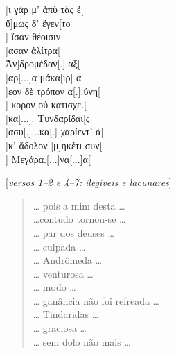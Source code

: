 \begin{gkverse}
]ι γάρ μ’ ἀπὺ τὰς ἐ[\\
ὔ]μως δ’ ἔγεν[το\\
   ] ἴσαν θέοισιν\\
 ]ασαν ἀλίτρα[\\
        Ἀν]δρομέδαν[.].αξ[\\
   ]αρ[...]α μάκα[ιρ] α\\
 ]εον δὲ τρόπον α[.].ύνη[\\
      ] κορον οὐ κατισχε.[\\
]κα[...]. Τυνδαρίδαι[ς\\
]ασυ[.]...κα[.] χαρίεντ’ ἀ[\\
]κ’ ἄδολον [μ]ηκέτι συν[\\
] Μεγάρα.[...]να[...]α[

\textnormal{[\emph{versos 1--2 e 4--7: ilegíveis e lacunares}]}

\end{gkverse}

\begin{verse}
\ldots{} pois a mim desta \ldots{}\\
\ldots{}contudo tornou-se \ldots{}\\
\ldots{} par dos deuses \ldots{}\\
\ldots{} culpada \ldots{}\\
\ldots{} Andrômeda \ldots{}\\
\ldots{} venturosa \ldots{}\\
\ldots{} modo \ldots{}\\
\ldots{} ganância não foi refreada \ldots{}\\
\ldots{} Tindaridas \ldots{}\\
\ldots{} graciosa \ldots{}\\
\ldots{} sem dolo não mais \ldots{}
\end{verse}

\medskip
